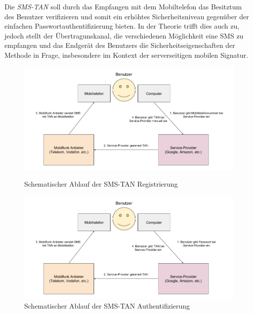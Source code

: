 \documentclass[11pt,a4paper,ngerman]{scrreprt}
\begin{document}
Die \textit{SMS-TAN} soll durch das Empfangen mit dem Mobiltelefon das Besitztum des Benutzer verifizieren und somit ein erhöhtes Sicherheitsniveau gegenüber der einfachen Passwortauthentifizierung bieten. In der Theorie trifft dies auch zu, jedoch stellt der Übertragunskanal, die verschiedenen Möglichkeit eine SMS zu empfangen und das Endgerät des Benutzers die Sicherheitseigenschaften der Methode in Frage, insbesondere im Kontext der serverseitigen mobilen Signatur.
\begin{figure}[htbp]
    \centering
        \includegraphics[width=\textwidth]{Abbildungen/Ablauf_SMS-TAN_Registrierung.png}
    \caption{Schematischer Ablauf der SMS-TAN Registrierung}
    \label{fig:SMS-TAN_Registrierung}

    \centering
        \includegraphics[width=\textwidth]{Abbildungen/Ablauf_SMS-TAN.png}
    \caption{Schematischer Ablauf der SMS-TAN Authentifizierung}
    \label{fig:SMS-TAN}
\end{figure}
\end{document}
